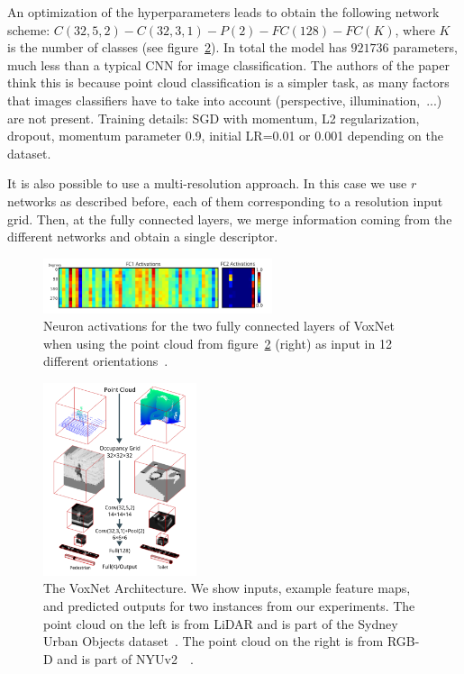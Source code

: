 An optimization of the hyperparameters leads to obtain the following network scheme:
$C(32, 5, 2) - C(32, 3, 1)-P(2)-F C(128)-F C(K)$, where $K$ is the number of classes (see figure~\ref{fig:VoxNet_archtecture}). In total the model has $921736$ parameters, much less than a typical CNN for image classification. The authors of the paper think this is because point cloud classification is a simpler task, as many factors that images classifiers have to take into account (perspective, illumination,~...) are not present. Training details: SGD with momentum, L2 regularization, dropout, momentum parameter 0.9, initial LR=0.01 or 0.001 depending on the dataset.


It is also possible to use a multi-resolution approach. In this case we use $r$ networks as described before, each of them corresponding to a resolution input grid. Then, at the fully connected layers, we merge information coming from the different networks and obtain a single descriptor.

\begin{figure}[ht]
    \centering
    \captionsetup{width=.7\linewidth}
    \includegraphics[width=0.6\textwidth]{images/VOLUM_invariance.png}
    \caption{Neuron activations for the two fully connected layers of VoxNet
when using the point cloud from figure~\ref{fig:VoxNet_archtecture} (right) as input in 12 different
orientations~\cite{VoxNet}.}
    \label{fig:VOLUM_invariance}
\end{figure}

\begin{figure}[ht]
    \centering
    \captionsetup{width=.9\linewidth}
    \includegraphics[width=0.4\textwidth]{images/VoxNet_archtecture.png}
    \caption{The VoxNet Architecture. We show inputs, example
feature maps, and predicted outputs for two instances from our experiments.
The point cloud on the left is from LiDAR and is part of the Sydney Urban
Objects dataset~\cite{dataset_ICRA2012}. The point cloud on the right is from RGB-D and is part of NYUv2~\cite{dataset_ECCV2012}~\cite{VoxNet}.}
    \label{fig:VoxNet_archtecture}
\end{figure}

